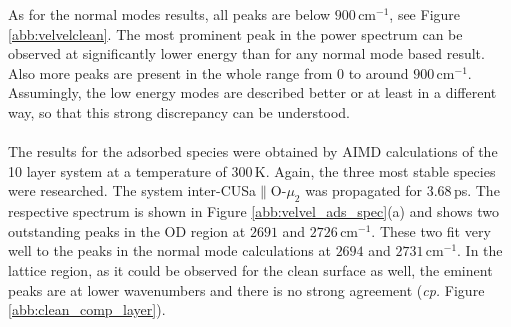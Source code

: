 \documentclass[11pt,DIV=13,BCOR=5mm,a4paper,headinclude]{scrbook}
\begin{document}
As for the normal modes results, all peaks are below $900\,$cm$^{-1}$, see Figure \ref{abb:velvelclean}.
The most prominent peak in the power spectrum can be observed at significantly lower energy than for any normal mode based result.
Also more peaks are present in the whole range from $0$ to around $900\,$cm$^{-1}$.
Assumingly, the low energy modes are described better or at least in a different way, so that this strong discrepancy can be understood.
\\\\
The results for the adsorbed species were obtained by AIMD calculations of the 10 layer system at a temperature of $300\,$K.
Again, the three most stable species were researched.
The system inter-CUSa$\parallel$O-$\mu_2$ was propagated for $3.68\,$ps.
The respective spectrum is shown in Figure \ref{abb:velvel_ads_spec}(a) and shows two outstanding peaks in the OD region at $2691$ and $2726\,$cm$^{-1}$.
These two fit very well to the peaks in the normal mode calculations at $2694$ and $2731\,$cm$^{-1}$.
In the lattice region, as it could be observed for the clean surface as well, the eminent peaks are at lower wavenumbers and there is no strong agreement (\textit{cp.} Figure \ref{abb:clean_comp_layer}).
\end{document}
